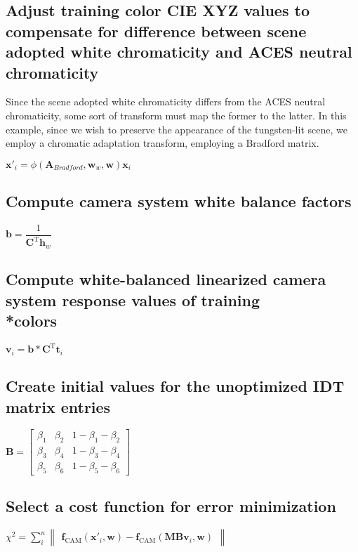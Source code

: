 \subsection{Adjust training color CIE XYZ values to compensate for difference between scene adopted white chromaticity and ACES neutral chromaticity}
Since the scene adopted white chromaticity differs from the ACES neutral chromaticity, some sort of transform must map the former to the latter. In this example, since we wish to preserve the appearance of the tungsten-lit scene, we employ a chromatic adaptation transform, employing a Bradford matrix.

$\mathbf{x}'_i = \phi(\mathbf{A}_{Bradford},\mathbf{w}_w,\mathbf{w})\mathbf{x}_i$

\subsection{Compute camera system white balance factors}
$\mathbf{b}=\dfrac{1}{\mathbf{C}^\mathrm{T}\mathbf{h}_w}$

\subsection{Compute white-balanced linearized camera system response values of training \\*colors}
$\mathbf{v}_i=\mathbf{b}*\mathbf{C}^\mathrm{T}\mathbf{t}_i$

\subsection{Create initial values for the unoptimized IDT matrix entries}
$   \mathbf{B} =
    \begin{bmatrix}
		\beta_1 & \beta_2 & 1-\beta_1-\beta_2 \\
		\beta_3 & \beta_4 & 1-\beta_3-\beta_4 \\
		\beta_5 & \beta_6 & 1-\beta_5-\beta_6
    \end{bmatrix}$

\subsection{Select a cost function for error minimization}
$\chi^2=\displaystyle\sum_{i}^{n}\begin{Vmatrix}\mathbf{f}_{\mathrm{CAM}}(\mathbf{x}'_i,\mathbf{w})-\mathbf{f}_{\mathrm{CAM}}(\mathbf{MBv}_i,\mathbf{w})\end{Vmatrix}$

